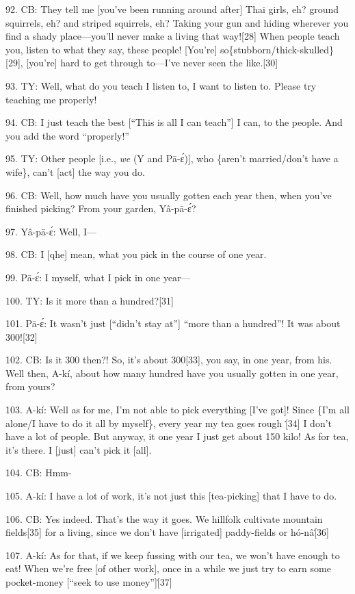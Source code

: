 92. CB: They tell me [you've been running around after] Thai girls, eh? ground
squirrels, eh? and striped squirrels, eh? Taking your gun and hiding wherever you
find a shady place---you'll never make a living that way![28]  When people teach
you, listen to what they say, these people!  [You're] so\{stubborn/thick-skulled\}[29],
[you're] hard to get through to---I've never seen the like.[30]

93. TY: Well, what do you teach I listen to, I want to listen to.  Please try teaching
me properly!

94. CB: I just teach the best [``This is all I can teach''] I can, to the people.
And you add the word ``properly!''

95. TY: Other people [i.e., \textit{we} (Y and Pā-ɛ́)], who \{aren't married/don't
have a wife\}, can't [act] the way you do.

96. CB: Well, how much have you usually gotten each year then, when you've finished
picking?  From your garden, Yâ-pā-ɛ́?

97. Yâ-pā-ɛ́: Well, I---

98. CB: I [qhe] mean, what you pick in the course of one year.

99. Pā-ɛ́: I myself, what I pick in one year---

100. TY: Is it more than a hundred?[31]

101. Pā-ɛ́: It wasn't just [``didn't stay at''] ``more than a hundred''!  It
was about 300![32]

102. CB: Is it 300 then?!  So, it's about 300[33], you say, in one year, from his.
Well then, A-kí, about how many hundred have you usually gotten in one year,
from yours?

103. A-kí: Well as for me, I'm not able to pick everything [I've got]!  Since
\{I'm all alone/I have to do it all by myself\}, every year my tea goes rough \.[34]
I don't have a lot of people.  But anyway, it one year I just get about 150 kilo!
As for tea, it's there.  I [just] can't pick it [all].

104. CB: Hmm-

105. A-kí: I have a lot of work, it's not just this [tea-picking] that I have
to do.

106. CB: Yes indeed.  That's the way it goes.  We hillfolk cultivate mountain fields[35]
for a living, since we don't have [irrigated] paddy-fields or hó-nâ\.[36]

107. A-kí: As for that, if we keep fussing with our tea, we won't have enough
to eat!  When we're free [of other work], once in a while we just try to earn some
pocket-money [``seek to use money'']\.[37]

